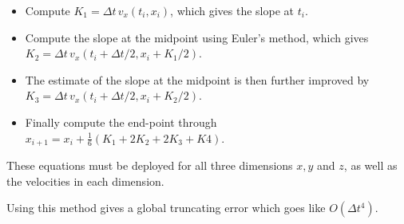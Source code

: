 \documentclass{article}
\begin{document}
\begin{multicols}{2}
\begin{itemize}
	\item Compute $K_1 = \Delta t \, v_x(t_i,x_i)$, which gives the slope at $t_i$.
	\item Compute the slope at the midpoint using Euler's method, which gives $K_2 = \Delta t \, v_x(t_i + \Delta t/2, x_i + K_1/2)$.
	\item The estimate of the slope at the midpoint is then further improved by $K_3 = \Delta t \, v_x(t_i + \Delta t/2, x_i + K_2/2)$.
	\item Finally compute the end-point through \\ $x_{i+1} = x_i + \frac{1}{6}(K_1 + 2K_2 + 2K_3 + K4)$.
\end{itemize}
These equations must be deployed for all three dimensions $x,y$ and $z$, as well as the velocities in each dimension.

Using this method gives a global truncating error which goes like $O(\Delta t^4)$. 



\end{multicols}
\end{document}
